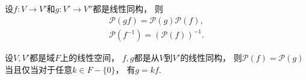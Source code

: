 \begin{property}%
设\(f\colon V \to V'\)和\(g\colon V' \to V''\)都是线性同构，
则\begin{gather*}
	\mathcal{P}(gf) = \mathcal{P}(g) \mathcal{P}(f), \\
	\mathcal{P}(f^{-1}) = (\mathcal{P}(f))^{-1}.
\end{gather*}
\end{property}

\begin{theorem}%
设\(V,V'\)都是域\(F\)上的线性空间，
\(f,g\)都是从\(V\)到\(V'\)的线性同构，
则\(\mathcal{P}(f) = \mathcal{P}(g)\)
当且仅当对于任意\(k \in F - \{0\}\)，
有\(g = k f\).
\end{theorem}
